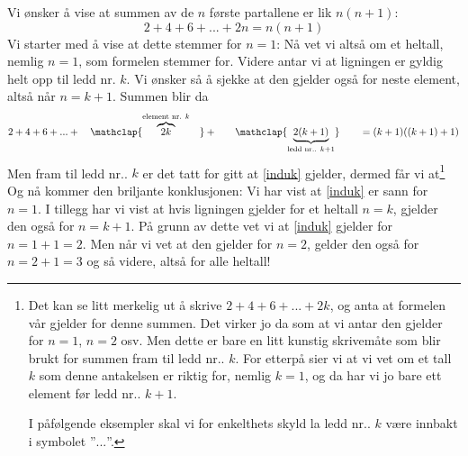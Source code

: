 Vi ønsker å vise at summen av de $ n $ første partallene er lik $ n(n+1) $:
\begin{equation}
	2+4+6+...+2n=n(n+1) \label{induk}
\end{equation}
Vi starter med å vise at dette stemmer for $ {n=1} $:
Nå vet vi altså om et heltall, nemlig $ {n=1} $, som formelen stemmer for. Videre antar vi at ligningen er gyldig helt opp til ledd nr. $ k $. Vi ønsker så å sjekke at den gjelder også for neste element, altså  når $ n=k+1 $. Summen blir da
\[ 2+4+6+...+\quad\mathclap{\overbrace{2k}^{\text{element nr. }k} \;\;\;\,}+\quad\;\;\;\mathclap{\underbrace{2(k+1)}_{\text{ledd nr.. }k+1}}\qquad=(k+1)((k+1)+1) \]
Men fram til ledd nr.. $ k $ er det tatt for gitt at \eqref{induk} gjelder, dermed får vi at\footnote{Det kan se litt merkelig ut å skrive $ {2+4+6+...+2k }$, og anta at formelen vår gjelder for denne summen. Det virker jo da som at vi antar den gjelder for $ {n=1 }$, $ {n=2 }$ osv. Men dette er bare en litt kunstig skrivemåte som blir brukt for summen fram til ledd nr.. $ k $. For etterpå sier vi at vi vet om et tall $ k $ som denne antakelsen er riktig for, nemlig $ {k=1} $, og da har vi jo bare ett element før ledd nr.. $ {k+1} $. 
	
	I påfølgende eksempler skal vi for enkelthets skyld la ledd nr.. $ k $ være innbakt i symbolet ''$ ... $''. }
Og nå kommer den briljante konklusjonen: Vi har vist at \eqref{induk} er sann for ${ n=1 }$. I tillegg har vi vist at hvis ligningen gjelder for et heltall ${n= k} $, gjelder den også for $ {n=k+1} $. På grunn av dette vet vi at \eqref{induk} gjelder for ${n= 1+1=2} $. Men når vi vet at den gjelder for $ {n=2} $, gelder den også for $ {n=2+1=3} $ og så videre, altså for alle heltall!\regv
{}
